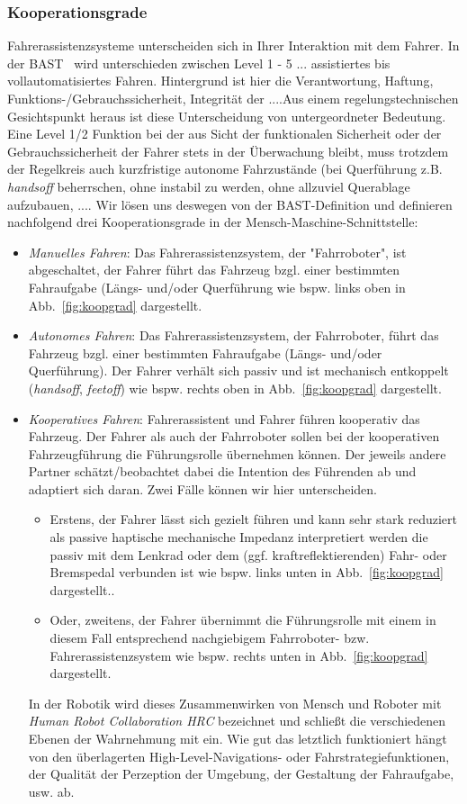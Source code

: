 \subsubsection*{Kooperationsgrade}
Fahrerassistenzsysteme unterscheiden sich in Ihrer Interaktion mit dem Fahrer. In der BAST~\cite{Gasser2012} wird unterschieden zwischen Level 1 - 5 ... assistiertes bis vollautomatisiertes Fahren. Hintergrund ist hier die Verantwortung, Haftung, Funktions-/Gebrauchssicherheit, Integrität der ....Aus einem regelungstechnischen Gesichtspunkt heraus ist diese Unterscheidung von untergeordneter Bedeutung.
Eine Level 1/2 Funktion bei der aus Sicht der funktionalen Sicherheit oder der Gebrauchssicherheit der Fahrer stets in der Überwachung bleibt, muss trotzdem der Regelkreis auch kurzfristige autonome Fahrzustände (bei Querführung z.B. \textit{handsoff} beherrschen, ohne instabil zu werden, ohne allzuviel Querablage aufzubauen, .... Wir lösen uns deswegen von der BAST-Definition und definieren nachfolgend drei Kooperationsgrade in der Mensch-Maschine-Schnittstelle:
\begin{itemize}
\item {\it Manuelles Fahren}: Das Fahrerassistenzsystem, der "Fahrroboter", ist abgeschaltet, der Fahrer führt das Fahrzeug bzgl. einer bestimmten Fahraufgabe (Längs- und/oder Querführung wie bspw. links oben in Abb.~\ref{fig:koopgrad} dargestellt.
\item {\it Autonomes Fahren}: Das Fahrerassistenzsystem, der Fahrroboter, führt das Fahrzeug bzgl. einer bestimmten Fahraufgabe (Längs- und/oder Querführung). Der Fahrer verhält sich passiv und ist mechanisch entkoppelt (\textit{handsoff}, \textit{feetoff}) wie bspw. rechts oben in Abb.~\ref{fig:koopgrad} dargestellt.
\item {\it Kooperatives Fahren}: Fahrerassistent und Fahrer führen kooperativ das Fahrzeug. Der Fahrer als auch der Fahrroboter sollen bei der kooperativen Fahrzeugführung die Führungsrolle übernehmen können. Der jeweils andere Partner schätzt/beobachtet dabei die Intention des Führenden ab und adaptiert sich daran. Zwei Fälle können wir hier unterscheiden. 
\begin{itemize}
\item Erstens, der Fahrer lässt sich gezielt führen und kann sehr stark reduziert als passive haptische mechanische Impedanz interpretiert werden die passiv mit dem Lenkrad oder dem (ggf. kraftreflektierenden) Fahr- oder Bremspedal verbunden ist wie bspw. links unten in Abb.~\ref{fig:koopgrad} dargestellt..  
\item Oder, zweitens, der Fahrer übernimmt die Führungsrolle mit einem in diesem Fall entsprechend nachgiebigem Fahrroboter- bzw. Fahrerassistenzsystem wie bspw. rechts unten in Abb.~\ref{fig:koopgrad} dargestellt. 
\end{itemize}
In der Robotik wird dieses Zusammenwirken von Mensch und Roboter mit {\it Human Robot Collaboration HRC} bezeichnet \cite{hrc_cite} und schließt die verschiedenen Ebenen der Wahrnehmung mit ein.  Wie gut das letztlich funktioniert hängt von den überlagerten High-Level-Navigations- oder Fahrstrategiefunktionen, der Qualität der Perzeption der Umgebung, der Gestaltung der Fahraufgabe, usw. ab. 
\end{itemize}
